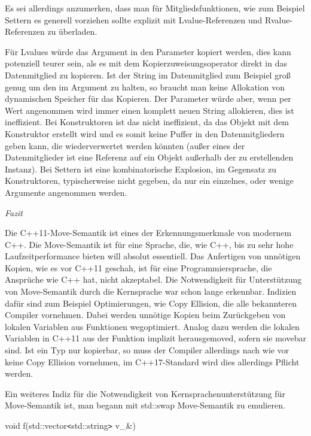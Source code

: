 \documentclass{article}
\begin{document}
Es sei allerdings anzumerken, dass man für Mitgliedsfunktionen, wie zum Beispiel 
Settern es generell vorziehen sollte explizit mit Lvalue-Referenzen und Rvalue-Referenzen 
zu überladen.

Für Lvalues würde das Argument in den Parameter kopiert werden, dies kann potenziell 
teurer sein, als es mit dem Kopierzuweisungsoperator direkt in das Datenmitglied 
zu kopieren. Ist der String im Datenmitglied zum Beispiel groß genug um den im 
Argument zu halten, so braucht man keine Allokation von dynamischen Speicher für 
das Kopieren. Der Parameter würde aber, wenn per Wert angenommen wird immer einen 
komplett neuen String allokieren, dies ist ineffizient. Bei Konstruktoren ist das 
nicht ineffizient, da das Objekt mit dem Konstruktor erstellt wird und es somit 
keine Puffer in den Datenmitgliedern geben kann, die wiederverwertet werden könnten 
(außer eines der Datenmitglieder ist eine Referenz auf ein Objekt außerhalb der 
zu erstellenden Instanz). Bei Settern ist eine kombinatorische Explosion, im Gegensatz 
zu Konstruktoren, typischerweise nicht gegeben, da nur ein einzelnes, oder wenige 
Argumente angenommen werden.

\vspace{38pt}
\emph{Fazit}

Die C++11-Move-Semantik ist eines der Erkennungsmerkmale von modernem C++. Die 
Move-Semantik ist für eine Sprache, die, wie C++, bis zu sehr hohe Laufzeitperformance 
bieten will absolut essentiell. Das Anfertigen von unnötigen Kopien, wie es vor 
C++11 geschah, ist für eine Programmiersprache, die Ansprüche wie C++ hat, nicht 
akzeptabel. Die Notwendigkeit für Unterstützung von Move-Semantik durch die Kernsprache 
war schon lange erkennbar. Indizien dafür sind zum Beispiel Optimierungen, wie 
Copy Ellision, die alle bekannteren Compiler vornehmen. Dabei werden unnötige 
Kopien beim Zurückgeben von lokalen Variablen aus Funktionen wegoptimiert. Analog 
dazu werden die lokalen Variablen in C++11 aus der Funktion implizit herausgemoved, 
sofern sie movebar sind. Ist ein Typ nur kopierbar, so muss der Compiler allerdings 
nach wie vor keine Copy Ellision vornehmen, im C++17-Standard wird dies allerdings 
Pflicht werden. 

Ein weiteres Indiz für die Notwendigkeit von Kernsprachenunterstützung für Move-Semantik 
ist, man begann mit std::swap Move-Semantik zu emulieren.

\vspace{12pt}
void f(std::vector\texttt{<}std::string\texttt{>} v\_\&)
\end{document}

